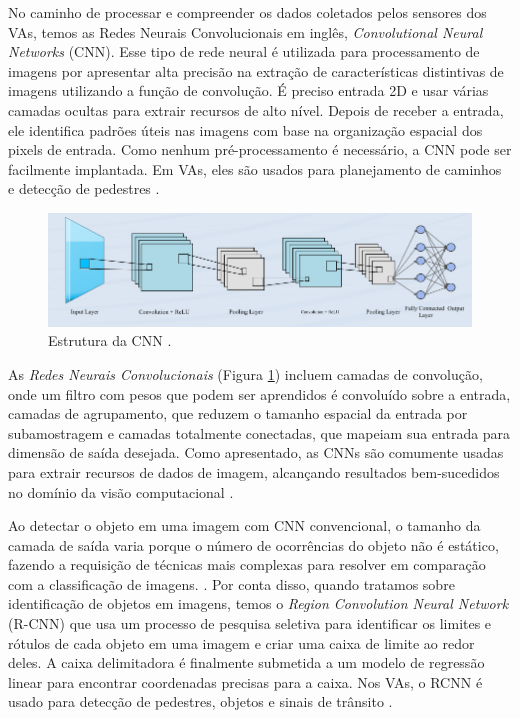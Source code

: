 No caminho de processar e compreender os dados coletados pelos sensores dos VAs, temos as Redes Neurais Convolucionais em inglês, \textit{Convolutional Neural Networks} (CNN). Esse tipo de rede neural é utilizada para processamento de imagens por apresentar alta precisão na extração de características distintivas de imagens utilizando a função de convolução. É preciso entrada 2D e usar várias camadas ocultas para extrair recursos de alto nível. Depois de receber a entrada, ele identifica padrões úteis nas imagens com base na organização espacial dos pixels de entrada. Como nenhum pré-processamento é necessário, a CNN pode ser facilmente implantada. Em VAs, eles são usados para planejamento de caminhos e detecção de pedestres \cite{review-auto}.

\begin{figure}[H]
\centering
\includegraphics[width=\textwidth]{Figures/CNN.png}
\caption{Estrutura da CNN \cite{software-cnn}.}
\label{CNN}
\end{figure}

As \textit{Redes Neurais Convolucionais} (Figura \ref{CNN}) incluem camadas de convolução, onde um filtro com pesos que podem ser aprendidos é convoluído sobre a entrada, camadas de agrupamento, que reduzem o tamanho espacial da entrada por subamostragem e camadas totalmente conectadas, que mapeiam sua entrada para dimensão de saída desejada. Como apresentado, as CNNs são comumente usadas para extrair recursos de dados de imagem, alcançando resultados bem-sucedidos no domínio da visão computacional \cite{software-review}.


Ao detectar o objeto em uma imagem com CNN convencional, o tamanho da camada de saída varia porque o número de ocorrências do objeto não é estático, fazendo a requisição de técnicas mais complexas para resolver em comparação com a classificação de imagens. \cite{software-cnn}.
Por conta disso, quando tratamos sobre identificação de objetos em imagens, temos o \textit{Region Convolution Neural Network} (R-CNN) que usa um processo de pesquisa seletiva para identificar os limites e rótulos de cada objeto em uma imagem e criar uma caixa de limite ao redor deles. A caixa delimitadora é finalmente submetida a um modelo de regressão linear para encontrar coordenadas precisas para a caixa. Nos VAs, o RCNN é usado para detecção de pedestres, objetos e sinais de trânsito \cite{review-auto}.


